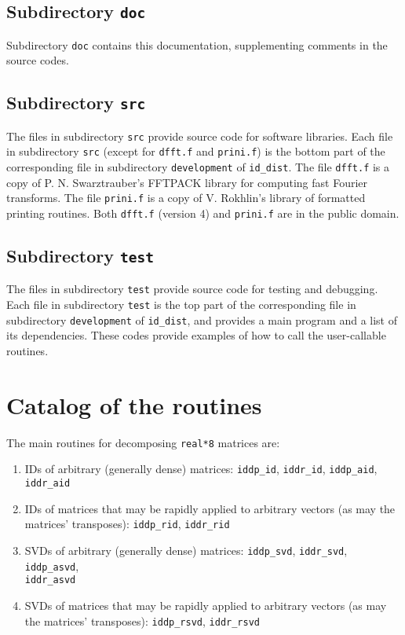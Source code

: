 \documentclass[letterpaper,12pt]{article}
\begin{document}
\subsection{Subdirectory {\tt doc}}

Subdirectory {\tt doc} contains this documentation,
supplementing comments in the source codes.


\subsection{Subdirectory {\tt src}}

The files in subdirectory {\tt src} provide source code
for software libraries. Each file in subdirectory {\tt src}
(except for {\tt dfft.f} and {\tt prini.f}) is
the bottom part of the corresponding file
in subdirectory {\tt development} of {\tt id\_dist}.
The file {\tt dfft.f} is a copy of P. N. Swarztrauber's FFTPACK library
for computing fast Fourier transforms.
The file {\tt prini.f} is a copy of V. Rokhlin's library
of formatted printing routines.
Both {\tt dfft.f} (version 4) and {\tt prini.f} are in the public domain.


\subsection{Subdirectory {\tt test}}

The files in subdirectory {\tt test} provide source code
for testing and debugging. Each file in subdirectory {\tt test} is
the top part of the corresponding file
in subdirectory {\tt development} of {\tt id\_dist},
and provides a main program and a list of its dependencies.
These codes provide examples of how to call the user-callable routines.



\section{Catalog of the routines}

The main routines for decomposing {\tt real*8} matrices are:
%
\begin{enumerate}
%
\item IDs of arbitrary (generally dense) matrices:
{\tt iddp\_id}, {\tt iddr\_id}, {\tt iddp\_aid}, {\tt iddr\_aid}
%
\item IDs of matrices that may be rapidly applied to arbitrary vectors
(as may the matrices' transposes):
{\tt iddp\_rid}, {\tt iddr\_rid}
%
\item SVDs of arbitrary (generally dense) matrices:
{\tt iddp\_svd}, {\tt iddr\_svd}, {\tt iddp\_asvd},\\{\tt iddr\_asvd}
%
\item SVDs of matrices that may be rapidly applied to arbitrary vectors
(as may the matrices' transposes):
{\tt iddp\_rsvd}, {\tt iddr\_rsvd}
%
\end{enumerate}
\end{document}
